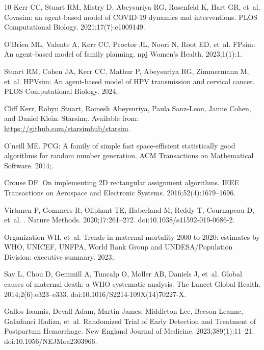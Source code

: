 \documentclass[10pt,letterpaper]{article}
\begin{document}
\begin{thebibliography}{10}
Kerr CC, Stuart RM, Mistry D, Abeysuriya RG, Rosenfeld K, Hart GR, et~al.
\newblock Covasim: an agent-based model of COVID-19 dynamics and interventions.
\newblock PLOS Computational Biology. 2021;17(7):e1009149.

O’Brien ML, Valente A, Kerr CC, Proctor JL, Noori N, Root ED, et~al.
\newblock FPsim: An agent-based model of family planning.
\newblock npj Women's Health. 2023;1(1):1.

Stuart RM, Cohen JA, Kerr CC, Mathur P, Abeysuriya RG, Zimmermann M, et~al.
\newblock HPVsim: An agent-based model of HPV transmission and cervical cancer.
\newblock PLOS Computational Biology. 2024;.

{Cliff Kerr, Robyn Stuart, Romesh Abeysuriya, Paula Sanz-Leon, Jamie Cohen, and Daniel Klein}. Starsim;.
\newblock Available from: \url{https://github.com/starsimhub/starsim}.

O’neill ME.
\newblock PCG: A family of simple fast space-efficient statistically good algorithms for random number generation.
\newblock ACM Transactions on Mathematical Software. 2014;.

Crouse DF.
\newblock On implementing 2D rectangular assignment algorithms.
\newblock IEEE Transactions on Aerospace and Electronic Systems. 2016;52(4):1679--1696.

Virtanen P, Gommers R, Oliphant TE, Haberland M, Reddy T, Cournapeau D, et~al.
.
\newblock Nature Methods. 2020;17:261--272.
\newblock doi:{10.1038/s41592-019-0686-2}.

Organization WH, et~al.
\newblock Trends in maternal mortality 2000 to 2020: estimates by WHO, UNICEF, UNFPA, World Bank Group and UNDESA/Population Division: executive summary. 2023;.

Say L, Chou D, Gemmill A, Tuncalp O, Moller AB, Daniels J, et~al.
\newblock Global causes of maternal death: a {WHO} systematic analysis.
\newblock The Lancet Global Health. 2014;2(6):e323--e333.
\newblock doi:{10.1016/S2214-109X(14)70227-X}.

{Gallos Ioannis}, {Devall Adam}, {Martin James}, {Middleton Lee}, {Beeson Leanne}, {Galadanci Hadiza}, et~al.
\newblock Randomized {Trial} of {Early} {Detection} and {Treatment} of {Postpartum} {Hemorrhage}.
\newblock New England Journal of Medicine. 2023;389(1):11--21.
\newblock doi:{10.1056/NEJMoa2303966}.


\end{thebibliography}
\end{document}
